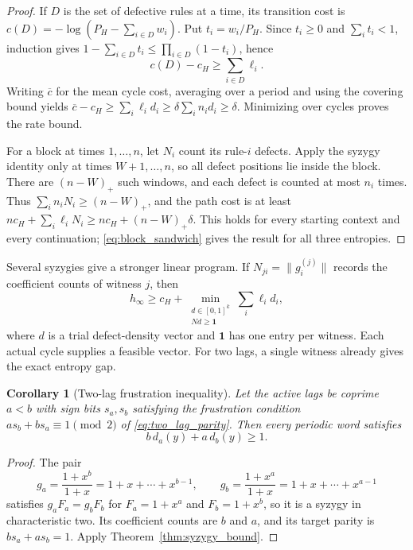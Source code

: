 \documentclass[11pt,a4paper]{article}
\newtheorem{corollary}[theorem]{Corollary}
\begin{document}
\begin{proof}
If $D$ is the set of defective rules at a time, its transition cost is
$c(D)=-\log(P_H-\sum_{i\in D}w_i)$.  Put $t_i=w_i/P_H$.
Since $t_i\ge0$ and $\sum_i t_i<1$, induction gives
$1-\sum_{i\in D}t_i\le\prod_{i\in D}(1-t_i)$, hence
\[
    c(D)-c_H\ge\sum_{i\in D}\ell_i.
\]
Writing $\overline c$ for the mean cycle cost, averaging over a
period and using the covering bound yields
$\overline c-c_H\ge\sum_i\ell_i d_i\ge\delta\sum_i n_i d_i\ge\delta$.
Minimizing over cycles proves the rate bound.

For a block at times $1,\ldots,n$, let $N_i$ count its rule-$i$
defects.  Apply the syzygy identity only at times $W+1,\ldots,n$,
so all defect positions lie inside the block.  There are $(n-W)_+$
such windows, and each defect is counted at most $n_i$ times.
Thus $\sum_i n_iN_i\ge(n-W)_+$, and the path cost is at least
$nc_H+\sum_i\ell_iN_i\ge nc_H+(n-W)_+\delta$.
This holds for every starting context and every continuation;
\eqref{eq:block_sandwich} gives the result for all three entropies.
\end{proof}

Several syzygies give a stronger linear program.  If
$N_{ji}=\|g_i^{(j)}\|$ records the coefficient counts of witness $j$,
then
\begin{equation}
\label{eq:syzygy_lp}
    h_\infty\ge c_H+
    \min_{\substack{d\in[0,1]^k\\Nd\ge\boldsymbol1}}
       \sum_i\ell_i d_i,
\end{equation}
where $d$ is a trial defect-density vector and $\boldsymbol1$ has
one entry per witness.  Each actual cycle supplies a feasible vector.
For two lags, a single witness already gives the exact entropy gap.

\begin{corollary}[Two-lag frustration inequality]
\label{cor:frustration_inequality}
Let the active lags be coprime $a<b$ with sign bits $s_a,s_b$
satisfying the frustration condition
$as_b+bs_a\equiv1\pmod2$ of \eqref{eq:two_lag_parity}.  Then every
periodic word satisfies
\begin{equation}
\label{eq:frustration_inequality}
    b\,d_a(y)+a\,d_b(y)\ge1 .
\end{equation}
\end{corollary}

\begin{proof}
The pair
\[
    g_a=\frac{1+x^b}{1+x}=1+x+\cdots+x^{b-1},
    \qquad
    g_b=\frac{1+x^a}{1+x}=1+x+\cdots+x^{a-1}
\]
satisfies $g_aF_a=g_bF_b$ for $F_a=1+x^a$ and $F_b=1+x^b$,
so it is a syzygy in characteristic two.  Its coefficient counts
are $b$ and $a$, and its target parity is $bs_a+as_b=1$.
Apply Theorem~\ref{thm:syzygy_bound}.
\end{proof}
\end{document}
